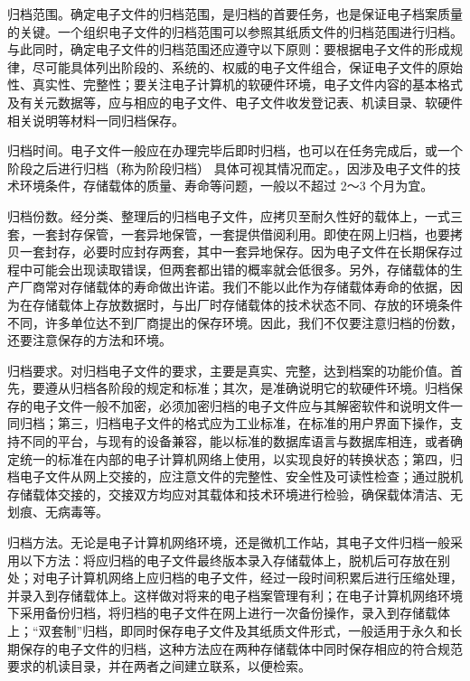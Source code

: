     \begin{enumerate.zh}
        \item 归档范围。确定电子文件的归档范围，是归档的首要任务，也是保证电子档案质量的关键。一个组织电子文件的归档范围可以参照其纸质文件的归档范围进行归档。与此同时，确定电子文件的归档范围还应遵守以下原则：要根据电子文件的形成规律，尽可能具体列出阶段的、系统的、权威的电子文件组合，保证电子文件的原始性、真实性、完整性；要关注电子计算机的软硬件环境，电子文件内容的基本格式及有关元数据等，应与相应的电子文件、电子文件收发登记表、机读目录、软硬件相关说明等材料一同归档保存。
        \item 归档时间。电子文件一般应在办理完毕后即时归档，也可以在任务完成后，或一个阶段之后进行归档（称为阶段归档） 具体可视其情况而定。，因涉及电子文件的技术环境条件，存储载体的质量、寿命等问题，一般以不超过 2～3 个月为宜。
        \item 归档份数。经分类、整理后的归档电子文件，应拷贝至耐久性好的载体上，一式三套，一套封存保管，一套异地保管，一套提供借阅利用。即使在网上归档，也要拷贝一套封存，必要时应封存两套，其中一套异地保存。因为电子文件在长期保存过程中可能会出现读取错误，但两套都出错的概率就会低很多。另外，存储载体的生产厂商常对存储载体的寿命做出许诺。我们不能以此作为存储载体寿命的依据，因为在存储载体上存放数据时，与出厂时存储载体的技术状态不同、存放的环境条件不同，许多单位达不到厂商提出的保存环境。因此，我们不仅要注意归档的份数，还要注意保存的方法和环境。
        \item 归档要求。对归档电子文件的要求，主要是真实、完整，达到档案的功能价值。首先，要遵从归档各阶段的规定和标准；其次，是准确说明它的软硬件环境。归档保存的电子文件一般不加密，必须加密归档的电子文件应与其解密软件和说明文件一同归档；第三，归档电子文件的格式应为工业标准，在标准的用户界面下操作，支持不同的平台，与现有的设备兼容，能以标准的数据库语言与数据库相连，或者确定统一的标准在内部的电子计算机网络上使用，以实现良好的转换状态；第四，归档电子文件从网上交接的，应注意文件的完整性、安全性及可读性检查；通过脱机存储载体交接的，交接双方均应对其载体和技术环境进行检验，确保载体清洁、无划痕、无病毒等。
        \item 归档方法。无论是电子计算机网络环境，还是微机工作站，其电子文件归档一般采用以下方法：将应归档的电子文件最终版本录入存储载体上，脱机后可存放在别处；对电子计算机网络上应归档的电子文件，经过一段时间积累后进行压缩处理，并录入到存储载体上。这样做对将来的电子档案管理有利；在电子计算机网络环境下采用备份归档，将归档的电子文件在网上进行一次备份操作，录入到存储载体上；“双套制”归档，即同时保存电子文件及其纸质文件形式，一般适用于永久和长期保存的电子文件的归档，这种方法应在两种存储载体中同时保存相应的符合规范要求的机读目录，并在两者之间建立联系，以便检索。
    \end{enumerate.zh}

